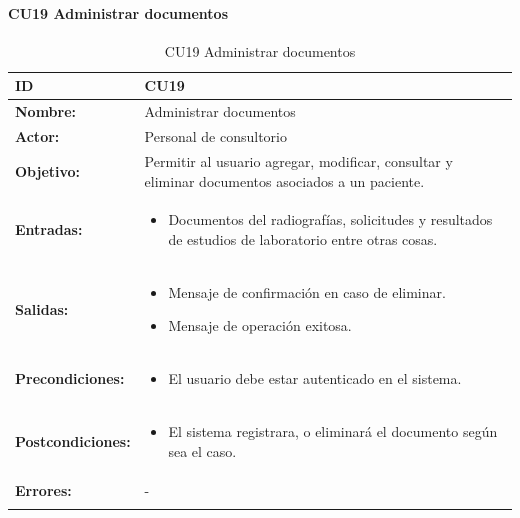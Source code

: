 
\paragraph{CU19 Administrar documentos}

\begin{longtable}[H]{|p{}|p{12cm}|}
\hline\textbf{ID}         
& \textbf{CU19}            \\ \hline
\textbf{Nombre:}          
& Administrar documentos   \\ \hline
\textbf{Actor:}          
& Personal de consultorio   \\ \hline
\textbf{Objetivo:}       
& Permitir al usuario agregar, modificar, consultar y eliminar documentos asociados a un paciente.\\ \hline
\textbf{Entradas:}  & 
\begin{itemize}[nosep]
\item Documentos del radiografías, solicitudes y resultados de estudios de laboratorio entre otras cosas.
\end{itemize}
\\ \hline
\textbf{Salidas:}  & 
\begin{itemize}[nosep]
\item Mensaje de confirmación en caso de eliminar.
\item Mensaje de operación exitosa.
\end{itemize}
\\ \hline
\textbf{Precondiciones:}  &             
\begin{itemize}[nosep]
\item El usuario debe estar autenticado en el sistema.
\end{itemize}
\\ \hline
\textbf{Postcondiciones:} & 
\begin{itemize}[nosep]
\item El sistema registrara, o eliminará el documento según sea el caso.
\end{itemize}
\\ \hline
\textbf{Errores:} &  -
\\ \hline
\caption{CU19 Administrar documentos}
\label{table:1}
\end{longtable}

